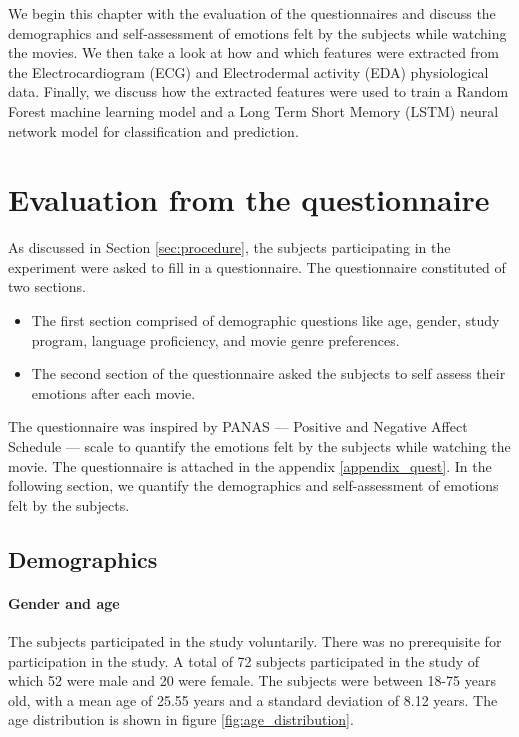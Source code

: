 We begin this chapter with the evaluation of the questionnaires and discuss the demographics and self-assessment of emotions felt by the subjects while watching the movies. We then take a look at how and which features were extracted from the Electrocardiogram (ECG) and Electrodermal activity (EDA) physiological data. Finally, we discuss how the extracted features were used to train a Random Forest machine learning model and a Long Term Short Memory (LSTM) \cite{lstm_hochreiter} neural network model for classification and prediction.

\section{Evaluation from the questionnaire}
As discussed in Section \ref{sec:procedure}, the subjects participating in the experiment were asked to fill in a questionnaire. The questionnaire constituted of two sections.
\begin{itemize}
    \item The first section comprised of demographic questions like age, gender, study program, language proficiency, and movie genre preferences.
    \item The second section of the questionnaire asked the subjects to self assess their emotions after each movie.
\end{itemize} 
The questionnaire was inspired by PANAS --- Positive and Negative Affect Schedule --- scale \cite{panas_crocker:1997} to quantify the emotions felt by the subjects while watching the movie. The questionnaire is attached in the appendix \ref{appendix_quest}. In the following section, we quantify the demographics and self-assessment of emotions felt by the subjects.
\subsection{Demographics}
\paragraph{Gender and age} The subjects participated in the study voluntarily. There was no prerequisite for participation in the study. A total of 72 subjects participated in the study of which 52 were male and 20 were female. The subjects were between 18-75 years old, with a mean age of 25.55 years and a standard deviation of 8.12 years. The age distribution is shown in figure \ref{fig:age_distribution}.

